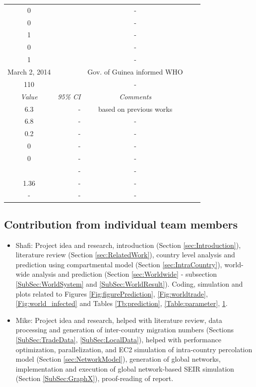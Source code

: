\documentclass[10pt, journal,onecolumn]{IEEEtran}
\begin{document}
\begin{appendix}
\begin{table}[h]
{\begin{tabular}{@{}crccc@{}}
 0& & -\\
 0& & -\\
 1& & -\\
 0& & -\\
 1& &-\\
 March 2, 2014 &  & Gov. of Guinea informed WHO\\
110 & & -\\
\midrule
 \textit{Value} & \textit{95\% CI} & \textit{Comments} \\
\midrule
6.3 & - & based on previous works \cite{}\\
6.8 & - & -\\
0.2 & - & -\\
0 & - & -\\
0 & - & -\\
 & - & -\\
1.36 &- &-\\
- & - &-\\
\end{tabular}
}
\label{Table:parameter2}
\end{table}




\subsection*{Contribution from individual team members}
\begin{itemize}
\item{Shafi: } Project idea and research, introduction (Section \ref{sec:Introduction}), literature review (Section \ref{sec:RelatedWork}), country level analysis and prediction using compartmental model (Section \ref{sec:IntraCountry}), world-wide analysis and prediction (Section \ref{sec:Worldwide} - subsection \ref{SubSec:WorldSystem} and \ref{SubSec:WorldResult}). Coding, simulation and plots related to Figures \ref{Fig:figurePrediction}, \ref{Fig:worldtrade}, \ref{Fig:world_infected} and Tables \ref{Tb:prediction}, \ref{Table:parameter}, \ref{Table:parameter2}.

\item{Mike: } Project idea and research, helped with literature review, data processing and generation of inter-country migration numbers (Sections \ref{SubSec:TradeData}, \ref{SubSec:LocalData}), helped with performance optimization, parallelization, and EC2 simulation of intra-country percolation model (Section \ref{sec:NetworkModel}), generation of global networks, implementation and execution of global network-based SEIR simulation (Section \ref{SubSec:GraphX}), proof-reading of report.


\end{itemize}
\end{appendix}
\end{document}
